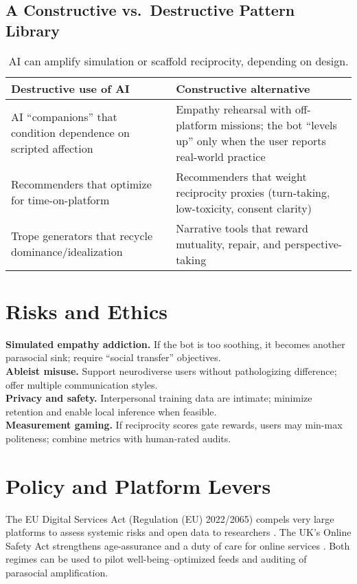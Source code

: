 \documentclass[12pt]{article}
\begin{document}
\subsection{A Constructive vs.\ Destructive Pattern Library}
\begin{table}[h]
  \centering
  \small
  \begin{tabular}{p{} p{}}
    \toprule
    \textbf{Destructive use of AI} & \textbf{Constructive alternative} \\
    \midrule
    AI ``companions'' that condition dependence on scripted affection & Empathy rehearsal with off-platform missions; the bot ``levels up'' only when the user reports real-world practice \\
    Recommenders that optimize for time-on-platform & Recommenders that weight reciprocity proxies (turn-taking, low-toxicity, consent clarity) \\
    Trope generators that recycle dominance/idealization & Narrative tools that reward mutuality, repair, and perspective-taking \\
    \bottomrule
  \end{tabular}
  \caption{AI can amplify simulation or scaffold reciprocity, depending on design.}
\end{table}

\section{Risks and Ethics}

\textbf{Simulated empathy addiction.} If the bot is too soothing, it becomes another parasocial sink; require ``social transfer'' objectives.\\
\textbf{Ableist misuse.} Support neurodiverse users without pathologizing difference; offer multiple communication styles.\\
\textbf{Privacy and safety.} Interpersonal training data are intimate; minimize retention and enable local inference when feasible.\\
\textbf{Measurement gaming.} If reciprocity scores gate rewards, users may min-max politeness; combine metrics with human-rated audits.

\section{Policy and Platform Levers}

The EU Digital Services Act (Regulation (EU) 2022/2065) compels very large platforms to assess systemic risks and open data to researchers \cite{dsa2022}. The UK's Online Safety Act strengthens age-assurance and a duty of care for online services \cite{osa2023}. Both regimes can be used to pilot well-being--optimized feeds and auditing of parasocial amplification.
\end{document}
